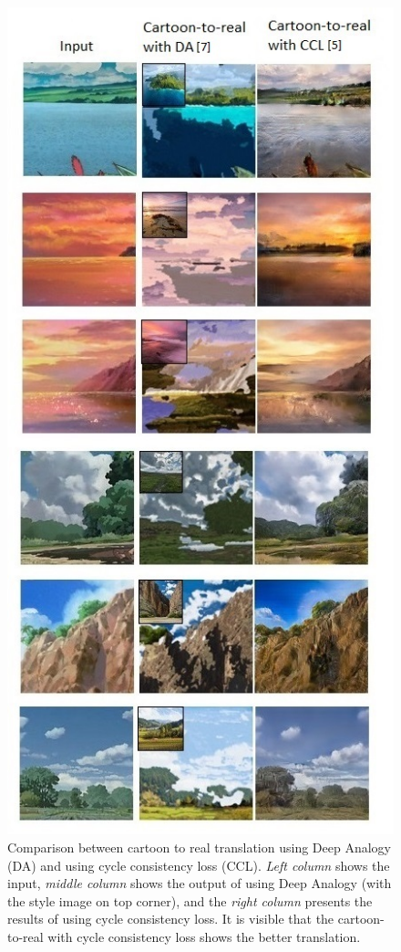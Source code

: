 \documentclass[conference,compsoc]{IEEEtran}
\begin{document}
\begin{figure}
\centering
   \includegraphics{Comparison-Final2.jpg}  
  
  \caption{Comparison between cartoon to real translation using Deep Analogy (DA) and using cycle consistency loss (CCL). \textit{Left column} shows the input, \textit{middle column} shows the output of using Deep Analogy (with the style image on top corner), and the \textit{right column} presents the results of using cycle consistency loss. It is visible that the cartoon-to-real with cycle consistency loss\cite{zhu2017unpaired} shows the better translation.}

  \label{fig:carto3}
  \end{figure}
\end{document}
